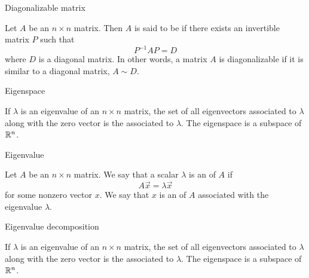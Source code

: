 \documentclass{ximera}
\begin{document}
Diagonalizable matrix
\begin{expandable}{}{}
    Let $A$ be an $n\times n$ matrix. Then $A$ is said to be  if there exists an invertible matrix $P$ such that
\begin{equation*}
P^{-1}AP=D
\end{equation*}
where $D$ is a diagonal matrix.  In other words, a matrix $A$ is diagonalizable if it is similar to a diagonal matrix, $A \sim D$.
\end{expandable}


Eigenspace
\begin{expandable}{}{}
    If $\lambda$ is an eigenvalue of an $n \times n$ matrix, the set of all eigenvectors associated to $\lambda$ along with the zero vector is the  associated to $\lambda$.  The eigenspace is a subspace of $\mathbb{R}^n$.
\end{expandable}


Eigenvalue
\begin{expandable}{}{}
    Let $A$ be an $n \times n$ matrix.  We say that a scalar $\lambda$ is an  of $A$ if $$A\vec{x} = \lambda \vec{x}$$
for some nonzero vector $x$.
We say that $x$ is an  of $A$ associated with the eigenvalue $\lambda$.
\end{expandable}


Eigenvalue decomposition
\begin{expandable}{}{}
    If $\lambda$ is an eigenvalue of an $n \times n$ matrix, the set of all eigenvectors associated to $\lambda$ along with the zero vector is the  associated to $\lambda$.  The eigenspace is a subspace of $\mathbb{R}^n$.
\end{expandable}

\end{document}
